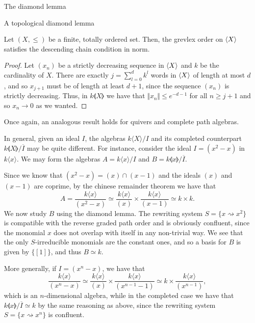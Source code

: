 \begin{chapter}{The diamond lemma}
\begin{section}{A topological diamond lemma}
\begin{lemma}\label{noeth-norm}Let $(X,\leq)$ be a finite, totally ordered set. Then, the grevlex order on $\langle X\rangle$ satisfies the descending chain condition in norm.
\end{lemma}
\begin{proof} Let $(x_n)$ be a strictly decreasing sequence in $\langle X\rangle$ and $k$ be the cardinality of $X$. There are exactly $j=\sum_{l=0}^d k^l$ words in $\langle X\rangle$ of length at most $d$, and so $x_{j+1}$ must be of length at least $d+1$, since the sequence $(x_n)$ is strictly decreasing. Thus, in $k\llangle X\rrangle$ we have that $\Vert x_{n}\Vert\leq e^{-d-1}$ for all $n\geq j+1$ and so $x_n\rightarrow 0$ as we wanted.
\end{proof}

Once again, an analogous result holds for quivers and complete path algebras.

\begin{exmp} In general, given an ideal $I$, the algebras $k\langle X\rangle/I$ and its completed counterpart $k\llangle X\rrangle/\overline{I}$ may be quite different. For instance, consider the ideal $I=(x^2-x)$ in $k\langle x \rangle$. We may form the algebras $A=k\langle x\rangle/I$ and $B=k\llangle x\rrangle/\overline{I}$.

Since we know that $(x^2-x)=(x)\cap(x-1)$ and the ideals $(x)$ and $(x-1)$ are coprime, by the chinese remainder theorem we have that
\[A=\frac{k\langle x\rangle}{(x^2-x)}\simeq \frac{k\langle x\rangle}{(x)} \times \frac{k\langle x\rangle}{(x-1)}\simeq k\times k.\]
We now study $B$ using the diamond lemma. The rewriting system $S=\{x\rightsquigarrow x^2\}$ is compatible with the reverse graded path order and is obviously confluent, since the monomial $x$ does not overlap with itself in any non-trivial way. We see that the only $S$-irreducible monomials are the constant ones, and so a basis for $B$ is given by $\{[1]\}$, and thus $B\simeq k$.

More generally, if $I=(x^n-x)$, we have that
\[\frac{k\langle x\rangle}{(x^n-x)} \simeq \frac{k\langle x\rangle}{(x)}\times \frac{k\langle x\rangle}{(x^{n-1}-1)}\simeq k \times \frac{k\langle x\rangle}{(x^{n-1})},\]
which is an $n$-dimensional algebra, while in the completed case we have that $k\llangle x\rrangle/\overline{I}\simeq k$ by the same reasoning as above, since the rewriting system $S=\{x\rightsquigarrow x^n\}$ is confluent.
\end{exmp}
\end{section}
\end{chapter}
